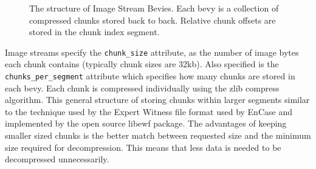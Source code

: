 \documentclass[10pt, conference]{IEEEtran}
\begin{document}
\begin{figure}[tb]
  \begin{center}
  \mbox{\columnwidth {}}
  \caption{The structure of Image Stream Bevies. Each bevy is a
collection of compressed chunks stored back to back. Relative chunk
offsets are stored in the chunk index segment.}
  \label{image_stream}
  \end{center}
\end{figure}

Image streams specify the \texttt{chunk\_size} attribute, as the
number of image bytes each chunk contains (typically chunk sizes are
32kb). Also specified is the \texttt{chunks\_per\_segment} attribute
which specifies how many chunks are stored in each bevy. Each chunk is
compressed individually using the zlib compress algorithm. This
general structure of storing chunks within larger segments similar to
the technique used by the Expert Witness file format used by
EnCase\cite{encase-3.0} and implemented by the open source
libewf\cite{libewf} package. The advantages of keeping smaller sized
chunks is the better match between requested size and the minimum size
required for decompression. This means that less data is needed to be
decompressed unnecessarily. 




\end{document}
